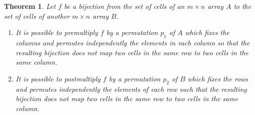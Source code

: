 \documentclass[11pt]{article}
\theoremstyle{plain}
\newtheorem{theorem}{Theorem}[section]
\theoremstyle{remark}
\theoremstyle{definition}
\theoremstyle{plain}
\begin{document}
\begin{theorem}\label{t:kh}
	Let $f$ be a bijection from the set of cells of an $m\times n$ array $A$ to
	the set of cells of another $m\times n$ array $B$.
	\begin{enumerate}\itemsep0pt
		\item It is possible to premultiply $f$ by a permutation $p_1$ of $A$ which
		fixes the columns and permutes independently the elements in each column so
		that the resulting bijection does not map two cells in the same row to two
		cells in the same column.
		\item It is possible to postmultiply $f$ by a permutation $p_2$ of $B$ which
		fixes the rows and permutes independently the elements of each row such that
		the resulting bijection does not map two cells in the same row to two cells
		in the same column.
	\end{enumerate}
	\label{arrays}
\end{theorem}
\end{document}
